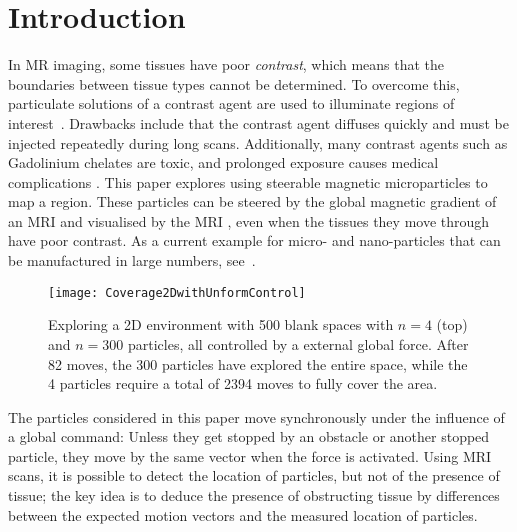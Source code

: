 \section{Introduction}\label{sec:Intro}
In MR imaging, some tissues have poor \emph{contrast}, which means that the boundaries between tissue types cannot be determined.
 To overcome this, particulate solutions of a contrast agent are used to illuminate regions of interest~\cite{na2009inorganic}. 
 Drawbacks include that the contrast agent diffuses quickly and must be injected repeatedly during long scans. 
 Additionally, many contrast agents such as Gadolinium chelates are toxic, and prolonged exposure causes medical complications \cite{caravan1999gadolinium}. 
This paper explores using steerable magnetic microparticles to map a region. 
These particles can be steered by the global magnetic gradient of an MRI and visualised by the MRI \cite{Vartholomeos2012}, even when the tissues they move through  have poor contrast.
As a current example for micro- and nano-particles that can be manufactured in large numbers, see~\cite{Chowdhury2015,martel2014computer,kim2015imparting,Donald2013,Ghosh2009,Ou2013,qiu2015magnetic}.

\begin{figure}
\begin{center}
	\texttt{[image: Coverage2DwithUnformControl]}
\end{center}
\caption{\label{fig:Coverage2DwithUnformControl}
Exploring a 2D environment with 500 blank spaces with $n=4$ (top) and $n=300$ particles, all controlled by a external global force.  After 82 moves, the 300 particles have explored the entire space, while the 4 particles require a total of 2394 moves to fully cover the area. 
}
\end{figure}

The particles considered in this paper move synchronously under the influence of a global command:
Unless they get stopped by an obstacle or another stopped particle, they move by the same vector when the force is activated. 
Using MRI scans, it is possible to detect the location of particles, but not of the presence of tissue;
the key idea is to deduce the presence of obstructing tissue by differences between the expected motion vectors and 
the measured location of particles.

